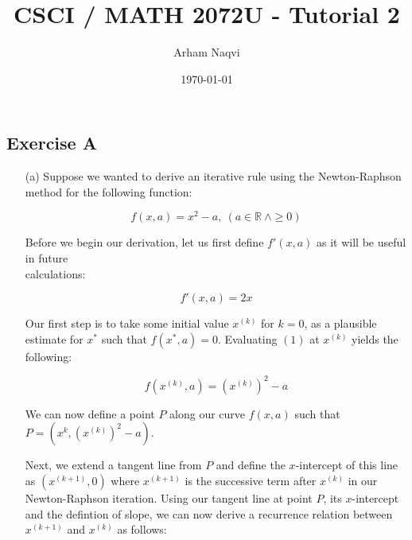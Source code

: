 \documentclass{article}
\title{CSCI / MATH 2072U - Tutorial 2}
\author{Arham Naqvi}
\date{\today}
\begin{document}
\maketitle

\vspace{10pt}


\subsection*{Exercise A}
\begin{enumerate}

    \vspace{20pt}

    \item[(a)]  Suppose we wanted to derive an iterative rule using the Newton-Raphson
                method for the following function:

                \begin{equation}
                    f(x,a)=x^{2}-a, ~ (a \in \mathbb{R}~ \land \geq 0)
                \end{equation}

                \vspace{5pt}
                Before we begin our derivation, let us first define $f'(x,a)$ as
                it will be useful in future\\ calculations:

                \begin{equation}
                    f'(x,a) = 2x
                \end{equation}

                \vspace{5pt}
                Our first step is to take some initial value $x^{(k)}$ for $k=0$,
                as a plausible estimate for $x^*$ such that $f(x^*,a)=0$.
                Evaluating $(1)$ at $x^{(k)}$ yields the following:

                \begin{equation}
                    f(x^{(k)},a) = (x^{(k)})^{2} - a 
                \end{equation}

                \vspace{5pt}
                We can now define a point $P$ along our curve $f(x,a)$ such that $P=(x^{k},(x^{(k)})^{2} - a)$.
                
                \vspace{25pt}
                Next, we extend a tangent line from $P$ and define the $x$-intercept of this
                line as $(x^{(k+1)},0)$ where $x^{(k+1)}$ is the successive term
                after $x^{(k)}$ in our Newton-Raphson iteration.
                Using our tangent line at point $P$, its $x$-intercept and the defintion
                of slope, we can now derive a recurrence relation between $x^{(k+1)}$
                and $x^{(k)}$ as follows:


\end{enumerate}
\end{document}
